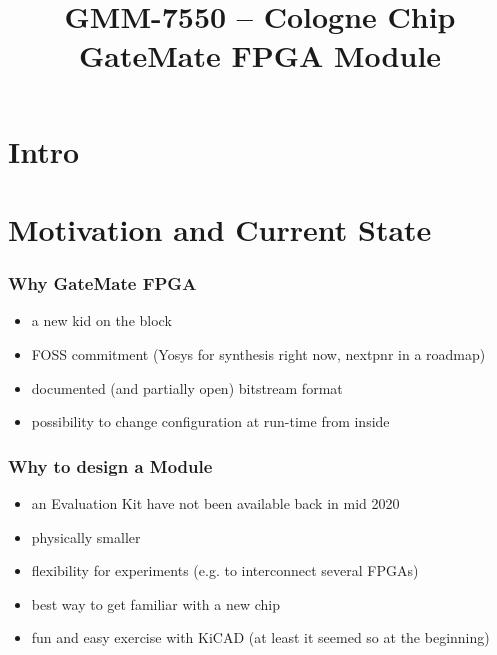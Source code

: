 
\usepackage{tikz}

\title{GMM-7550 -- Cologne Chip GateMate FPGA Module}
\subtitle{}




\begin{frame}
  \titlepage
\end{frame}

\section{Intro}



\frame{\tableofcontents}

\section{Motivation and Current State}

\begin{frame}
  \frametitle{Why GateMate FPGA}


  \begin{itemize}
    \item a new kid on the block
    \item FOSS commitment (Yosys for synthesis right now, nextpnr
    in a roadmap)
    \item documented (and partially open) bitstream format
    \item possibility to change configuration at run-time from inside
  \end{itemize}
\end{frame}

\begin{frame}
  \frametitle{Why to design a Module}

  \begin{itemize}
    \item an Evaluation Kit have not been available back in mid 2020
    \item physically smaller
    \item flexibility for experiments (e.g. to interconnect several FPGAs)
    \item best way to get familiar with a new chip
    \item fun and easy exercise with KiCAD (at least it seemed so at the beginning)
  \end{itemize}
\end{frame}

